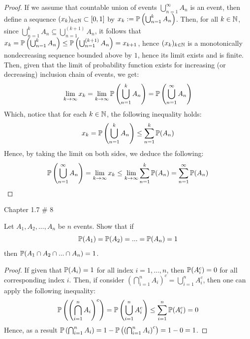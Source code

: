 \documentclass{article}
\begin{document}
\begin{proof}
    If we assume that countable union of events $\bigcup_{n=1}^\infty A_n$ is an event, then define a sequence $(x_k)_{k\in\mathbb{N}}\subset [0,1]$ by $x_k := \mathbb{P}\left(\bigcup_{n=1}^k A_n\right)$. Then, for all $k\in\mathbb{N}$, since $\bigcup_{n=1}^k A_n \subseteq \bigcup_{n=1}^{(k+1)}A_n$, it follows that $x_k = \mathbb{P}\left(\bigcup_{n=1}^k A_n\right)\leq \mathbb{P}\left(\bigcup_{n=1}^{(k+1)} A_n\right)=x_{k+1}$, hence $(x_k)_{k\in\mathbb{N}}$ is a monotonically nondecreasing sequence bounded above by $1$, hence its limit exists and is finite. Then, given that the limit of probability function exists for increasing (or decreasing) inclusion chain of events, we get:
    \begin{align}
        \lim_{k\rightarrow \infty}x_k = \lim_{k\rightarrow\infty}\mathbb{P}\left(\bigcup_{n=1}^k A_n\right) = \mathbb{P}\left(\bigcup_{n=1}^\infty A_n\right)
    \end{align}
    Which, notice that for each $k\in\mathbb{N}$, the following inequality holds:
    \begin{align}
        x_k = \mathbb{P}\left(\bigcup_{n=1}^k A_n\right) \leq \sum_{n=1}^k \mathbb{P}(A_n)
    \end{align}
    Hence, by taking the limit on both sides, we deduce the following:
    \begin{align}
        \mathbb{P}\left(\bigcup_{n=1}^\infty A_n\right) = \lim_{k\rightarrow\infty}x_k \leq \lim_{k\rightarrow\infty}\sum_{n=1}^k\mathbb{P}(A_n) = \sum_{n=1}^\infty\mathbb{P}(A_n)
    \end{align}
\end{proof}

\hfil

\begin{ques}\label{q10}
    Chapter 1.7 \# 8

    Let $A_1,A_2,...,A_n$ be $n$ events. Show that if 
    $$\mathbb{P}(A_1)=\mathbb{P}(A_2)=...=\mathbb{P}(A_n)=1$$
    then $\mathbb{P}(A_1\cap A_2 \cap ... \cap A_n)=1$.
\end{ques}

\begin{proof}
    If given that $\mathbb{P}(A_i)=1$ for all index $i=1,...,n$, then $\mathbb{P}(A_i^c) = 0$ for all corresponding index $i$. Then, if consider $\left(\bigcap_{i=1}^n A_i\right)^c = \bigcup_{i=1}^n A_i^c$, then one can apply the following inequality:
    \begin{align}
        \mathbb{P}\left(\left(\bigcap_{i=1}^n A_i\right)^c\right)=\mathbb{P}\left(\bigcup_{i=1}^n A_i^c\right)\leq \sum_{i=1}^n \mathbb{P}(A_i^c) = 0
    \end{align}
    Hence, as a result $\mathbb{P}\left(\bigcap_{i=1}^n A_i\right)=1-\mathbb{P}\left(\left(\bigcap_{i=1}^n A_i\right)^c\right)=1-0=1$.
\end{proof}
\end{document}
